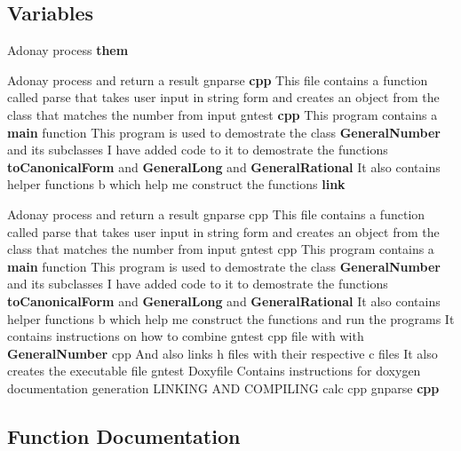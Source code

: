 \subsection*{Variables}
\begin{DoxyCompactItemize}
\item 
Adonay process {\bf them}
\item 
Adonay process and return a result gnparse {\bf cpp} This file contains a function called parse that takes user input in string form and creates an object from the class that matches the number from input gntest {\bf cpp} This program contains a {\bf main} function This program is used to demostrate the class {\bf General\+Number} and its subclasses I have added code to it to demostrate the functions {\bf to\+Canonical\+Form} and {\bf General\+Long} and {\bf General\+Rational} It also contains helper functions b which help me construct the functions {\bf link}
\item 
Adonay process and return a result gnparse cpp This file contains a function called parse that takes user input in string form and creates an object from the class that matches the number from input gntest cpp This program contains a {\bf main} function This program is used to demostrate the class {\bf General\+Number} and its subclasses I have added code to it to demostrate the functions {\bf to\+Canonical\+Form} and {\bf General\+Long} and {\bf General\+Rational} It also contains helper functions b which help me construct the functions and run the programs It contains instructions on how to combine gntest cpp file with with {\bf General\+Number} cpp And also links h files with their respective c files It also creates the executable file gntest Doxyfile Contains instructions for doxygen documentation generation L\+I\+N\+K\+I\+NG A\+ND C\+O\+M\+P\+I\+L\+I\+NG calc cpp gnparse {\bf cpp}
\end{DoxyCompactItemize}


\subsection{Function Documentation}
